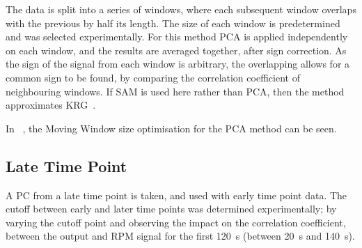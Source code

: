             
            
            
            
    
        The data is split into a series of windows, where each subsequent window overlaps with the previous by half its length. The size of each window is predetermined and was selected experimentally. For this method \acrshort{PCA} is applied independently on each window, and the results are averaged together, after sign correction. As the sign of the signal from each window is arbitrary, the overlapping allows for a common sign to be found, by comparing the correlation coefficient of neighbouring windows. If \gls{SAM} is used here rather than \acrshort{PCA}, then the method approximates \gls{KRG}~\cite{Schleyer2014}.
        
        In~%
        , the Moving Window size optimisation for the \gls{PCA} %
        method can be seen.
        
            
    \subsection{Late Time Point} \label{sec:late_time_point}
        A \gls{PC} from a late time point is taken, and used with early time point data. The cutoff between early and later time points was determined experimentally; by varying the cutoff point and observing the impact on the correlation coefficient, between the output and \gls{RPM} signal for the first \SI{120}{\second} (between \SI{20}{\second} and \SI{140}{\second}).
        
